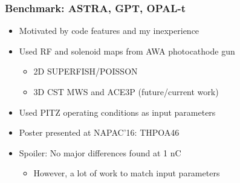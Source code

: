 \documentclass[professionalfonts,t]{beamer}
\begin{document}
\begin{frame}
\frametitle{Benchmark: ASTRA, GPT, OPAL-t}
\begin{itemize}
	\item{Motivated by code features and my inexperience}
	\item{Used RF and solenoid maps from AWA photocathode gun}
	\begin{itemize}
		\item 2D SUPERFISH/POISSON
		\item 3D CST MWS and ACE3P (future/current work)
	\end{itemize}
	\item{Used PITZ operating conditions as input parameters}
	\item{Poster presented at NAPAC'16: THPOA46}
	\item{Spoiler: No major differences found at 1 nC}
	\begin{itemize}
		\item However, a lot of work to match input parameters
	\end{itemize}
\end{itemize}
\end{frame}
\end{document}
